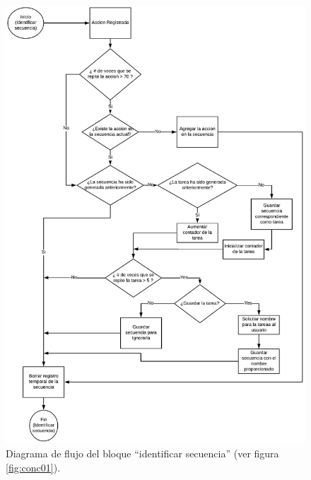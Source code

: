 \begin{figure}[]
\centering
\includegraphics[width=1.0\columnwidth]{chap4/Imagenes/concepto2.eps}
\caption{Diagrama de flujo del bloque ``identificar secuencia'' (ver figura
 \ref{fig:conc01}).}
\label{fig:conc02}
\end{figure} 